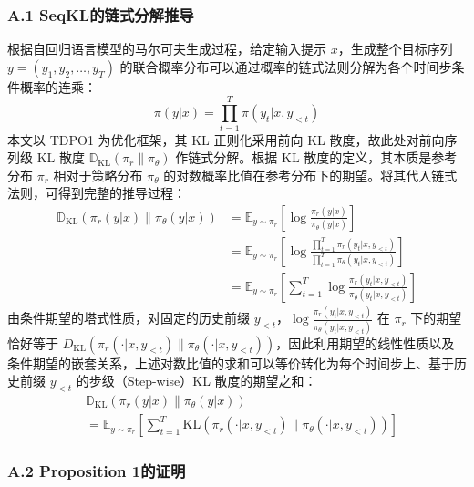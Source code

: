 \documentclass[lettersize,journal]{IEEEtran}
\begin{document}
\subsubsection*{A.1 SeqKL的链式分解推导}\label{app:1}
根据自回归语言模型的马尔可夫生成过程，给定输入提示 $x$，生成整个目标序列 $y = (y_1, y_2, \dots, y_T)$ 的联合概率分布可以通过概率的链式法则分解为各个时间步条件概率的连乘：
\begin{equation}
    \pi(y|x) = \prod_{t=1}^T \pi(y_t | x, y_{<t})
\end{equation}
本文以 TDPO1 为优化框架，其 KL 正则化采用前向 KL 散度，故此处对前向序列级 KL 散度 $\mathbb{D}_{\text{KL}}(\pi_r \| \pi_\theta)$ 作链式分解。根据 KL 散度的定义，其本质是参考分布 $\pi_r$ 相对于策略分布 $\pi_\theta$ 的对数概率比值在参考分布下的期望。将其代入链式法则，可得到完整的推导过程：
\begin{equation}
\begin{aligned} \mathbb{D}_{\text{KL}}(\pi_r(y|x) \| \pi_\theta(y|x)) &= \mathbb{E}_{y \sim \pi_r} \left[ \log \frac{\pi_r(y|x)}{\pi_\theta(y|x)} \right] \\ &= \mathbb{E}_{y \sim \pi_r} \left[ \log \frac{\prod_{t=1}^T \pi_r(y_t | x, y_{<t})}{\prod_{t=1}^T \pi_\theta(y_t | x, y_{<t})} \right] \\ &= \mathbb{E}_{y \sim \pi_r} \left[ \sum_{t=1}^T \log \frac{\pi_r(y_t | x, y_{<t})}{\pi_\theta(y_t | x, y_{<t})} \right] \end{aligned}
\end{equation}
由条件期望的塔式性质，对固定的历史前缀 $y_{<t}$，$\log\frac{\pi_r(y_t|x,y_{<t})}{\pi_\theta(y_t|x,y_{<t})}$ 在 $\pi_r$ 下的期望恰好等于 $D_{\text{KL}}(\pi_r(\cdot|x,y_{<t})\|\pi_\theta(\cdot|x,y_{<t}))$，因此利用期望的线性性质以及条件期望的嵌套关系，上述对数比值的求和可以等价转化为每个时间步上、基于历史前缀 $y_{<t}$ 的步级（Step-wise）KL 散度的期望之和：
\begin{equation}
\begin{aligned}
    &\mathbb{D}_{\text{KL}}(\pi_r(y|x) \| \pi_\theta(y|x)) \\
    &= \mathbb{E}_{y \sim \pi_r} \left[ \sum_{t=1}^T \text{KL} \left( \pi_r(\cdot|x, y_{<t}) \| \pi_\theta(\cdot|x, y_{<t}) \right) \right]
\end{aligned}
\end{equation}

\subsubsection*{A.2 Proposition 1的证明}\label{app:2}
 
\end{document}
